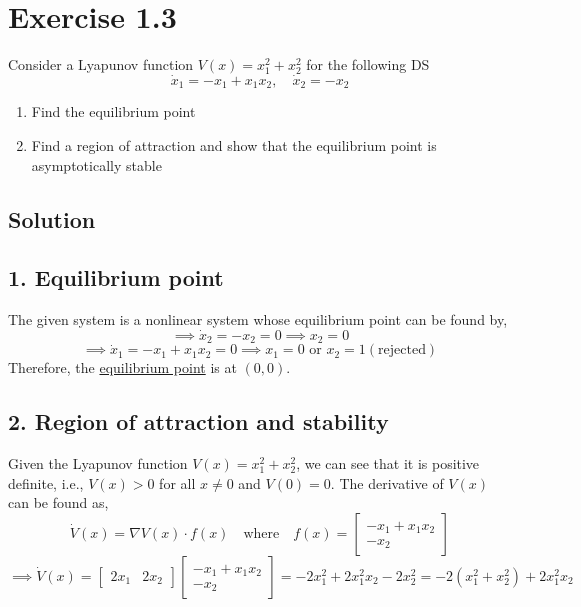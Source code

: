 \section*{Exercise 1.3}

Consider a Lyapunov function \( V(x)=x_{1}^{2}+x_{2}^{2} \) for the following DS
\begin{equation*}
    \dot{x}_{1}=-x_{1}+x_{1} x_{2}, \quad \dot{x}_{2}=-x_{2}
\end{equation*}
\begin{enumerate}[noitemsep]
    \item Find the equilibrium point
    \item Find a region of attraction and show that the equilibrium point is asymptotically stable
\end{enumerate}

\subsection*{Solution}

\subsection*{1. Equilibrium point}

The given system is a nonlinear system whose equilibrium point can be found by,
\[
    \implies
    \dot{x}_{2} = -x_{2} = 0
    \implies
    x_{2} = 0
\]
\[
    \implies
    \dot{x}_{1} = -x_{1} + x_{1} x_{2} = 0
    \implies
    x_{1} = 0 \text{ or } x_{2} = 1 (\text{rejected})
\]
Therefore, the \underline{equilibrium point} is at \( \boxed{ (0, 0) } \).

\subsection*{2. Region of attraction and stability}

Given the Lyapunov function \( V(x) = x_{1}^{2} + x_{2}^{2} \), we can see that it is positive definite, i.e., \( V(x) > 0 \) for all \( x \neq 0 \) and \( V(0) = 0 \).
The derivative of \( V(x) \) can be found as,
\[
    \dot{V}(x) = \nabla V(x) \cdot f(x)
    \quad \text{where} \quad
    f(x) = \begin{bmatrix} -x_{1} + x_{1} x_{2} \\ -x_{2} \end{bmatrix}
\]
\[
    \implies
    \dot{V}(x) = \begin{bmatrix} 2x_{1} & 2x_{2} \end{bmatrix}
    \begin{bmatrix} -x_{1} + x_{1} x_{2} \\ -x_{2} \end{bmatrix}
    = -2x_{1}^{2} + 2x_{1}^{2} x_{2} - 2x_{2}^{2}
    = -2(x_{1}^{2} + x_{2}^{2}) + 2x_{1}^{2} x_{2}
\]
